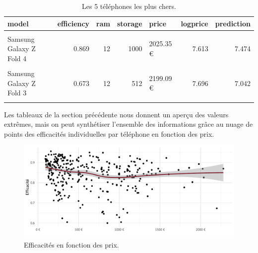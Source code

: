 \documentclass[
  12pt,
]{report}
\begin{document}
\begin{table}[!h]

\caption{\label{tab:kbl_inexpensive}Les 5 téléphones les plus chers.}
\centering
\begin{tabular}[t]{lrrrlrr}
\toprule
\textbf{model} & \textbf{efficiency} & \textbf{ram} & \textbf{storage} & \textbf{price} & \textbf{logprice} & \textbf{prediction}\\
\midrule
\cellcolor{gray!6}{iPhone 15 Pro Max} & \cellcolor{gray!6}{0.893} & \cellcolor{gray!6}{8} & \cellcolor{gray!6}{1000} & \cellcolor{gray!6}{1979 €} & \cellcolor{gray!6}{7.590} & \cellcolor{gray!6}{7.548}\\
Samsung Galaxy Z Fold 4 & 0.869 & 12 & 1000 & 2025.35 € & 7.613 & 7.474\\
\cellcolor{gray!6}{Samsung Galaxy Z Fold 5} & \cellcolor{gray!6}{0.826} & \cellcolor{gray!6}{12} & \cellcolor{gray!6}{512} & \cellcolor{gray!6}{2039 €} & \cellcolor{gray!6}{7.620} & \cellcolor{gray!6}{7.343}\\
Samsung Galaxy Z Fold 3 & 0.673 & 12 & 512 & 2199.09 € & 7.696 & 7.042\\
\cellcolor{gray!6}{Samsung Galaxy Z Fold 5} & \cellcolor{gray!6}{0.870} & \cellcolor{gray!6}{12} & \cellcolor{gray!6}{1000} & \cellcolor{gray!6}{2279 €} & \cellcolor{gray!6}{7.731} & \cellcolor{gray!6}{7.595}\\
\bottomrule
\end{tabular}
\end{table}

\newpage

Les tableaux de la section précédente nous donnent un aperçu des valeurs
extrêmes, mais on peut synthétiser l'ensemble des informations grâce au
nuage de points des efficacités individuelles par téléphone en fonction
des prix.

\begin{figure}[H]

{\centering \includegraphics{report_files/figure-pdf/unnamed-chunk-6-1.pdf}

}

\caption{Efficacités en fonction des prix.}

\end{figure}%
\end{document}
